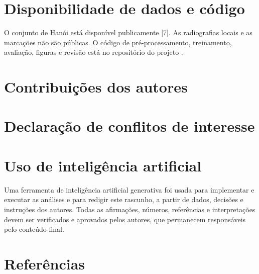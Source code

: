 \documentclass[twocolumn]{article}
\begin{document}
\section*{Disponibilidade de dados e código}

O conjunto de Hanói está disponível publicamente [7]. As radiografias locais e as marcações não são públicas.  O código de pré-processamento, treinamento, avaliação, figuras e revisão está no repositório do projeto .

\section*{Contribuições dos autores}


\section*{Declaração de conflitos de interesse}


\section*{Uso de inteligência artificial}

Uma ferramenta de inteligência artificial generativa foi usada para implementar e executar as análises e para redigir este rascunho, a partir de dados, decisões e instruções dos autores. Todas as afirmações, números, referências e interpretações devem ser verificados e aprovados pelos autores, que permanecem responsáveis pelo conteúdo final.

\balance
\section*{Referências}
\end{document}
